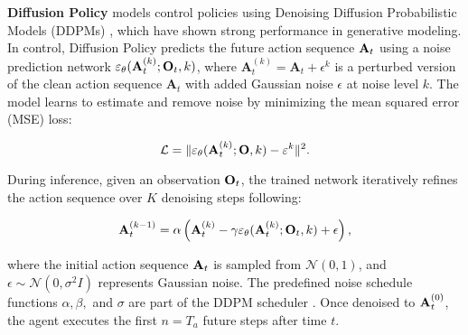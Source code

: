 \textbf{Diffusion Policy} \citep{chi2023diffusion} models control policies using Denoising Diffusion Probabilistic Models (DDPMs) \citep{ho2020denoising}, which have shown strong performance in generative modeling. In control, Diffusion Policy predicts the future action sequence \({\mathbf{A}_t}\) using a noise prediction network \(\varepsilon_\theta({\mathbf{A}}_t^{(k)}; {\mathbf{O}_t}, k)\), where \({\mathbf{A}}_t^{(k)} = {\mathbf{A}}_t + \epsilon^{k}\) is a perturbed version of the clean action sequence \({\mathbf{A}}_t\) with added Gaussian noise \(\epsilon\) at noise level \(k\). The model learns to estimate and remove noise by minimizing the mean squared error (MSE) loss:

\[
\mathcal{L} = \|\varepsilon_\theta({\mathbf{A}}_t^{(k)}; \mathbf{O}, k) - \varepsilon^k\|^2.
\]

During inference, given an observation \({\mathbf{O}_t}\), the trained network iteratively refines the action sequence over \(K\) denoising steps following:

\[
{\mathbf{A}}_t^{(k-1)} = \alpha \left({\mathbf{A}}_t^{(k)} - \gamma \varepsilon_\theta({\mathbf{A}}_t^{(k)}; {\mathbf{O}_t}, k) + \epsilon \right),
\]

where the initial action sequence \({\mathbf{A}}_t\) is sampled from \(\mathcal{N}(0,1)\), and \(\epsilon \sim \mathcal{N}(0, \sigma^2 I)\) represents Gaussian noise. The predefined noise schedule functions \(\alpha, \beta,\) and \(\sigma\) are part of the DDPM scheduler \citep{ho2020denoising}. Once denoised to \({\mathbf{A}}_t^{(0)}\), the agent executes the first \(n = T_a\) future steps after time \(t\).
